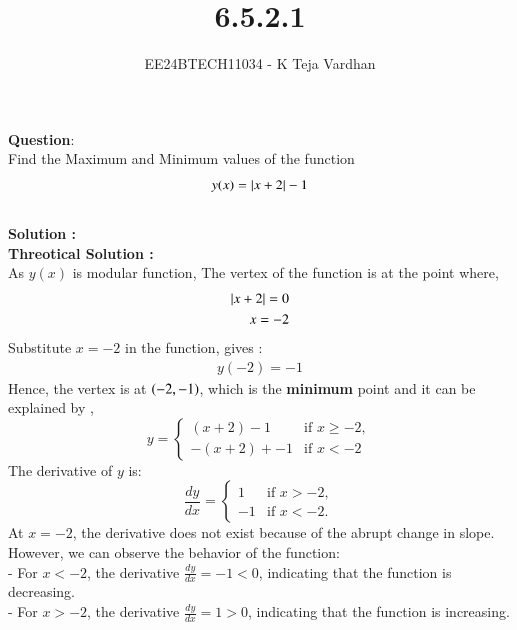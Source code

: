 \documentclass[journal]{IEEEtran}
\begin{document}

\vspace{3cm}

\title{6.5.2.1}
\author{EE24BTECH11034 - K Teja Vardhan}
{\let\newpage\relax\maketitle}

\renewcommand{\thefigure}{\theenumi}
\renewcommand{\thetable}{\theenumi}
\setlength{\intextsep}{10pt} %

\renewcommand{\thetable}{\theenumi}
\textbf{Question}:\\
Find the Maximum and Minimum values of the function \\
$$y(x) =  \left\vert x + 2\right\vert -1$$\\
\textbf{Solution : }\\
\textbf{Threotical Solution :}\\

As $y(x)$ is modular function, The vertex of the function is at the point where,
\begin{align}
    \left\vert x + 2\right\vert = 0\\
    x = -2
\end{align}
Substitute $x = -2$ in the function, gives :
\begin{align}
    y(-2) = -1
\end{align}
Hence, the vertex is at $\left(-2,-1\right)$, which is the \textbf{minimum} point and it can be explained by ,
$$y =
\begin{cases} 
(x+2) -1 & \text{if } x \geq -2, \\ 
-(x+2) + -1 & \text{if } x < -2
\end{cases}
$$
The derivative of $y$ is:
$$
\frac{dy}{dx} =
\begin{cases} 
1 & \text{if } x > -2, \\ 
-1 & \text{if } x < -2.
\end{cases}
$$
At $x = -2$, the derivative does not exist because of the abrupt change in slope. However, we can observe the behavior of the function:\\
- For \( x < -2 \), the derivative \( \frac{dy}{dx} = -1 < 0 \), indicating that the function is decreasing.\\
- For \( x > -2 \), the derivative \( \frac{dy}{dx} = 1 > 0 \), indicating that the function is increasing.\\
\end{document}
